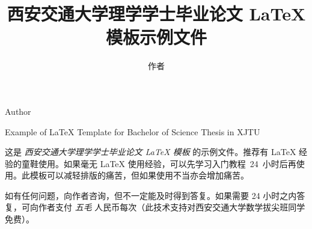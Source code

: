 \documentclass[%
               print, 
              ]{xjtubsc}
\begin{document}

\author{作者}{Author}	%
\title{西安交通大学理学学士毕业论文 \LaTeX{} 模板示例文件}{Example of \LaTeX{} Template for Bachelor of Science Thesis in XJTU}	%


\begin{INFObackground} %


\end{INFObackground}

\begin{INFOdata} %


\end{INFOdata}

\begin{INFOtask} %


\end{INFOtask}

\begin{INFOrequirement} %


\end{INFOrequirement}

\begin{INFOsubmit} %


\end{INFOsubmit}

\begin{INFOreference} %


\end{INFOreference}

\frontmatter

\extrapages %

\begin{abstractcn} %
这是 \emph{西安交通大学理学学士毕业论文 \LaTeX{} 模板} 的示例文件。推荐有 \LaTeX{} 经验的童鞋使用。如果毫无 \LaTeX{} 使用经验，可以先学习入门教程~24~小时后再使用。此模板可以减轻排版的痛苦，但如果使用不当亦会增加痛苦。

如有任何问题，向作者咨询，但不一定能及时得到答复。如果需要 24 小时之内答复，可向作者支付 \emph{五毛} 人民币每次（此技术支持对西安交通大学数学拔尖班同学免费）。

\end{abstractcn}
\end{document}
